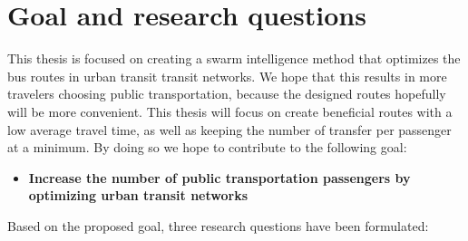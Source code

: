 \section{Goal and research questions}
\label{sec:goalAndResearchQuestions}
This thesis is focused on creating a swarm intelligence method that optimizes the bus routes in urban transit transit networks. We hope that this results in more travelers choosing public transportation, because the designed routes hopefully will be more convenient. This thesis will focus on create beneficial routes with a low average travel time, as well as keeping the number of transfer per passenger at a minimum. By doing so we hope to contribute to the following goal: 

\begin{itemize}
\item \label{itm:goal} \textbf{Increase the number of public transportation passengers by optimizing urban transit networks}
\end{itemize}

Based on the proposed goal, three research questions have been formulated: 

